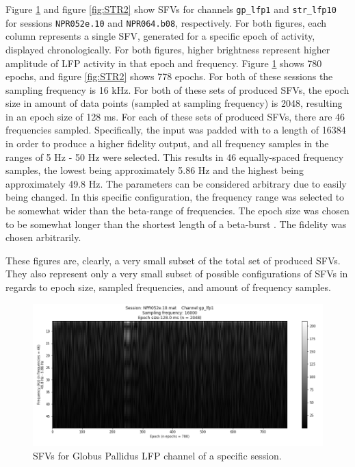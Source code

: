 \documentclass{article}
\begin{document}
Figure \ref{fig:GP1} and figure \ref{fig:STR2} show SFVs for channels \texttt{gp\_lfp1} and \texttt{str\_lfp10} for sessions \texttt{NPR052e.10} and \texttt{NPR064.b08}, respectively. 
For both figures, each column represents a single SFV, generated for a specific epoch of activity, displayed chronologically. 
For both figures, higher brightness represent higher amplitude of LFP activity in that epoch and frequency.
Figure \ref{fig:GP1} shows 780 epochs, and figure \ref{fig:STR2} shows 778 epochs. 
For both of these sessions the sampling frequency is 16 kHz. 
For both of these sets of produced SFVs, the epoch size in amount of data points (sampled at sampling frequency) is 2048, resulting in an epoch size of 128 ms. 
For each of these sets of produced SFVs, there are 46 frequencies sampled. 
Specifically, the input was padded with to a length of 16384 in order to produce a higher fidelity output, and all frequency samples in the ranges of 5 Hz - 50 Hz were selected. 
This results in 46 equally-spaced frequency samples, the lowest being approximately 5.86 Hz and the highest being approximately 49.8 Hz. 
The parameters can be considered arbitrary due to easily being changed.
In this specific configuration, the frequency range was selected to be somewhat wider than the beta-range of frequencies.
The epoch size was chosen to be somewhat longer than the shortest length of a beta-burst \citep{Cagnan}.
The fidelity was chosen arbitrarily.

These figures are, clearly, a very small subset of the total set of produced SFVs. They also represent only a very small subset of possible configurations of SFVs in regards to epoch size, sampled frequencies, and amount of frequency samples.

\begin{figure}[H]
    \centering
    \centerline{\includegraphics[width=1\textwidth]{images/GP1.png}}
    \caption{SFVs for Globus Pallidus LFP channel of a specific session.}
    \label{fig:GP1}
\end{figure}
\end{document}
